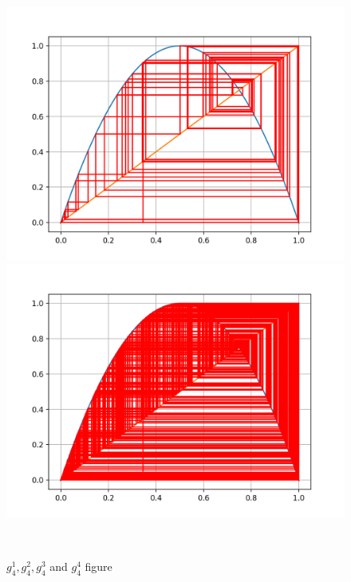 \documentclass[12pt]{article}
\theoremstyle{plain}
\begin{document}
\begin{figure}[H]
\begin{minipage}[c][0.24\width]{0.24\textwidth}
\end{minipage}
\begin{minipage}[c][0.24\width]{0.24\textwidth}
   \centering
   \includegraphics[width=\textwidth]{figure/section1/4-logistic-stable-100.png}
\end{minipage}
\begin{minipage}[c][0.24\width]{0.24\textwidth}
   \centering
   \includegraphics[width=\textwidth]{figure/section1/4-logistic-stable-500.png}
\end{minipage}
\\[3ex]\caption{$g_4^1, g_4^2, g_4^3$ and $g_4^4$ figure}\label{4-logistic-ite}
\end{figure}
\end{document}
